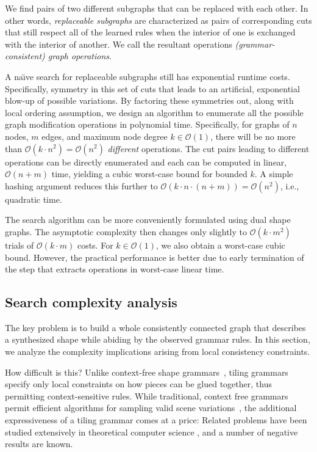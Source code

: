  We find pairs of two different subgraphs that can be replaced with each other. In other words, \emph{replaceable subgraphs} are characterized as pairs of corresponding cuts that still respect all of the learned rules when the interior of one is exchanged with the interior of another. We call the resultant operations \emph{(grammar-consistent) graph operations}.


 A na\"{\i}ve search for replaceable subgraphs still has exponential runtime costs.
Specifically, symmetry in this set of cuts that leads to an artificial, exponential blow-up of possible variations. By factoring these symmetries out, along with local ordering assumption, we design an algorithm to enumerate all the possible graph modification operations in polynomial time. Specifically, for graphs of $n$ nodes, $m$ edges, and maximum node degree $k \in \mathcal{O}(1)$, there will be no more than $\mathcal{O}(k \cdot n^2)=\mathcal{O}(n^2)$ \emph{different} operations. The cut pairs leading to different operations can be directly enumerated and each can be computed in linear, $\mathcal{O}(n+m)$ time, yielding a cubic worst-case bound for bounded $k$. A simple hashing argument reduces this further to $\mathcal{O}(k \cdot n \cdot (n+m)) = \mathcal{O}(n^2)$, i.e., quadratic time.

 The search algorithm can be more conveniently formulated using dual shape graphs. The asymptotic complexity then changes only slightly to $\mathcal{O}(k \cdot m^2)$ trials of $\mathcal{O}(k \cdot m)$ costs. For $k \in \mathcal{O}(1)$, we also obtain a worst-case cubic bound. However, the practical performance is better due to early termination of the step that extracts operations in worst-case linear time.

\subsection{Search complexity analysis}

The key problem is to build a whole consistently connected graph that describes a synthesized shape while abiding by the observed grammar rules. In this section, we analyze the complexity implications arising from local consistency constraints.

How difficult is this? Unlike context-free shape grammars~\cite{StinyGibs71,Mueller2006}, tiling grammars specify only local constraints on how pieces can be glued together, thus permitting context-sensitive rules. While traditional, context free grammars permit efficient algorithms for sampling valid scene variations~\cite{Bokeloh2010}, the additional expressiveness of a tiling grammar comes at a price: Related problems have been studied extensively in theoretical computer science \cite{Reghizzi2003}, and a number of negative results are known.

